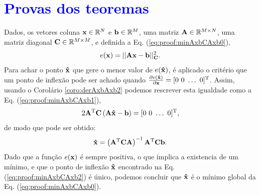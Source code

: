 \section{\textcolor{blue}{Provas dos teoremas}}
 
\begin{myproofT}\label{proof:theo:minAxbCAxb}
Dados,
os vetores coluna $\VECTOR{x}\in \mathbb{R}^N$ e $\VECTOR{b}\in \mathbb{R}^M$,  
uma matriz $\MATRIX{A} \in \mathbb{R}^{M\times N}$, 
uma matriz diagonal $\MATRIX{C} \in \mathbb{R}^{M\times M}$, e 
definida a Eq. (\ref{eq:proof:minAxbCAxb0}),
\begin{equation}\label{eq:proof:minAxbCAxb0}
e(\VECTOR{x})=||\MATRIX{A}\VECTOR{x}-\VECTOR{b}||_{\MATRIX{C}}^2.
\end{equation}
Para achar o ponto $\VECTOR{\hat{x}}$ que gere o menor valor de $e(\VECTOR{\hat{x}})$, é aplicado
o critério que um ponto de inflexão pode ser achado quando 
$\frac{\partial e(\VECTOR{\hat{x}})}{\partial \VECTOR{x} }=[0~ 0~ \hdots~ 0 ]^{\transpose}$.
Assim, usando o Corolário \ref{coro:derAxbAxb2} podemos 
rescrever esta igualdade como a Eq. (\ref{eq:proof:minAxbCAxb1}),
\begin{equation}\label{eq:proof:minAxbCAxb1}
2 \MATRIX{A}^{\transpose}\MATRIX{C}\left(\MATRIX{A}\VECTOR{\hat{x}}-\VECTOR{b}\right)=[0~ 0~ \hdots~ 0 ]^{\transpose},
\end{equation}
de modo que pode ser obtido:
\begin{equation}\label{eq:proof:minAxbCAxb2}
\VECTOR{\hat{x}}=\left( \MATRIX{A}^{\transpose}\MATRIX{C}\MATRIX{A} \right)^{-1} \MATRIX{A}^{\transpose}\MATRIX{C} \VECTOR{b}.
\end{equation}
Dado que  a função $e(\VECTOR{x})$ é sempre positiva, o que implica a existencia de um mínimo,
e que o ponto de inflexão $\VECTOR{\hat{x}}$ encontrado na Eq. (\ref{eq:proof:minAxbCAxb2}) é único, 
podemos concluir que  $\VECTOR{\hat{x}}$ é o mínimo global da Eq. (\ref{eq:proof:minAxbCAxb0}).
\end{myproofT}

